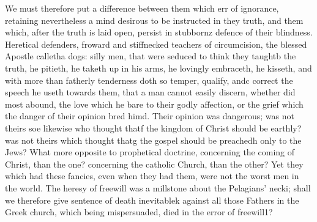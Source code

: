 We must therefore put a difference between them which err of ignorance, retaining nevertheless a mind desirous to be instructed in they truth, and them which, after the truth is laid open, persist in stubbornz defence of their blindness. Heretical defenders, froward and stiffnecked teachers of circumcision, the blessed Apostle calletha dogs: silly men, that were seduced to think they taughtb the truth, he pitieth, he taketh up in his arms, he lovingly embraceth, he kisseth, and with more than fatherly tenderness doth so temper, qualify, andc correct the speech he useth towards them, that a man cannot easily discern, whether did most abound, the love which he bare to their godly affection, or the grief which the danger of their opinion bred himd. Their opinion was dangerous; was not theirs soe likewise who thought thatf the kingdom of Christ should be earthly? was not theirs which thought thatg the gospel should be preachedh only to the Jews? What more opposite to prophetical doctrine, concerning the coming of Christ, than the one? concerning the catholic Church, than the other? Yet they which had these fancies, even when they had them, were not the worst men in the world. The heresy of freewill was a millstone about the Pelagians’ necki; shall we therefore give sentence of death inevitablek against all those Fathers in the Greek church, which being mispersuaded, died in the error of freewill1?

